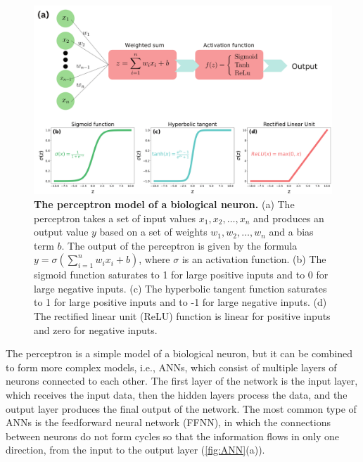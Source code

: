 \begin{figure}[H]
  \centering
  \includegraphics[width=\textwidth]{Figures/Perceptron.pdf}
  \caption[The perceptron model of a biological neuron]{
    \textbf{The perceptron model of a biological neuron.} (a) The perceptron
    takes a set of input values $x_1, x_2, \ldots, x_n$ and produces an
    output
    value $y$ based on a set of weights $w_1, w_2, \ldots, w_n$ and a bias
    term
    $b$. The output of the perceptron is given by the formula
    $y=\sigma(\sum_{i=1}^n w_ix_i + b)$, where $\sigma$ is an activation
    function. (b) The sigmoid function saturates to 1 for large positive
    inputs
    and to 0 for large negative inputs. (c) The hyperbolic tangent function
    saturates to 1 for large positive inputs and to -1 for large negative
    inputs. (d) The rectified linear unit (ReLU) function is linear for
    positive inputs and zero for negative inputs.}
  \label{fig:Perceptron}
\end{figure}

The perceptron is a simple model of a biological neuron, but it can be
combined to form more complex models, i.e., ANNs, which consist of multiple
layers of neurons connected to each other. The first layer of the network is
the input layer, which receives the input data, then the hidden layers
process
the data, and the output layer produces the final output of the network. The
most common type of ANNs is the feedforward neural network (FFNN), in which the
connections between neurons do not form cycles so that the information flows
in only one direction, from the input to the output layer (\cref{fig:ANN}(a)).

